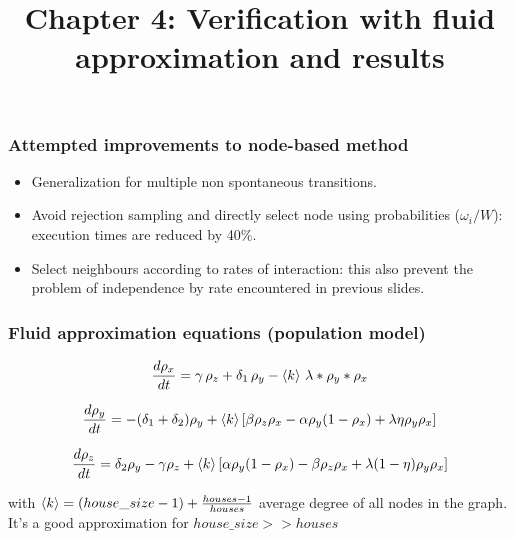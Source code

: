 \documentclass{beamer}
\begin{document}
	\begin{frame}
	\frametitle{Attempted improvements to node-based method}

	\begin{itemize}
		\item Generalization for multiple non spontaneous transitions.
		\item Avoid rejection sampling and directly select node using probabilities ($\omega_i/W$): execution times are reduced by 40\%.
		\item Select neighbours according to rates of interaction: this also prevent the problem of independence by rate encountered in previous slides.
	\end{itemize}
	\vspace{5 pt}
	\end{frame}

	
	\begin{frame}
	\title{Chapter 4: Verification with fluid approximation and results}
	\subtitle{}
	\date{}
	\titlepage
	\end{frame}

	
	\begin{frame}
	\frametitle{Fluid approximation equations (population model)}
	
	$$ \frac{d\rho_x}{dt}=\gamma\,\rho_z+\delta_1\,\rho_y-\braket{k}\,\lambda*\rho_y*\rho_x$$
	
	$$ \frac{d \rho_y}{dt}=-(\delta_1+\delta_2)\rho_y+\braket{k}[\beta \rho_z\rho_x-\alpha \rho_y(1-\rho_x)+\lambda\eta\rho_y\rho_x]$$
	
	$$ \frac{d\rho_z}{dt}=\delta_2\rho_y-\gamma \rho_z+\braket{k}[\alpha \rho_y(1-\rho_x)-\beta \rho_z\rho_x+\lambda(1-\eta)\rho_y\rho_x]$$

	with $\braket{k}=(house\_size-1)+\frac{houses-1}{houses}$ average degree of all nodes in the graph. It's a good approximation for $house\_size>>houses$

	\end{frame}
\end{document}
